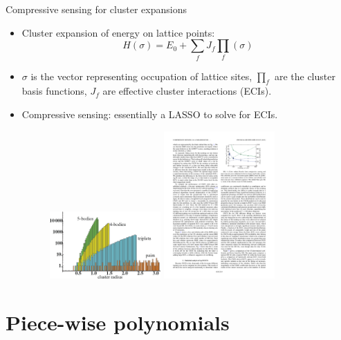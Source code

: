 \documentclass[aspectratio=169]{beamer}
\begin{document}
\begin{frame}{Compressive sensing for cluster expansions}
    \begin{itemize}
        \item Cluster expansion of energy on lattice points:
        \begin{equation*}
            H(\sigma) = E_0 + \sum_f J_f \prod_f(\sigma)
        \end{equation*}
        \item $\sigma$ is the vector representing occupation of lattice sites, $\prod_f$ are the cluster basis functions, $J_f$ are effective cluster interactions (ECIs).
        \item Compressive sensing: essentially a LASSO to solve for ECIs.\cite{nelsonCompressiveSensingParadigm2013}
        \begin{figure}
            \centering
            \includegraphics[width=0.4\textwidth]{figures/numberofclusters.png}
            \includegraphics[width=0.4\textwidth]{figures/ecifit.pdf}
        \end{figure}
    \end{itemize}
\end{frame} 

\section{Piece-wise polynomials}
\end{document}
